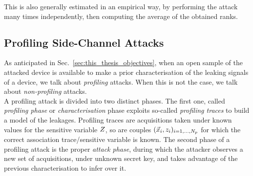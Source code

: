 This is also generally estimated in an empirical way, by performing the attack many times independently, then computing the average of the obtained ranks. 



\subsection{Profiling Side-Channel Attacks}\label{sec:profilingSCA}
As anticipated in Sec.~\ref{sec:this_thesis_objectives}, when an open sample of the attacked device is available to make a prior characterisation of the leaking signals of a device, we talk about \emph{profiling} attacks. When this is not the case, we talk about \emph{non-profiling} attacks. \\
A profiling attack is divided into two distinct phases. The first one, called \emph{profiling phase} or \emph{characterisation} phase exploits so-called \emph{profiling traces} to build a model of the leakages. Profiling traces are acquisitions taken under known values for the sensitive variable $Z$, so are couples $(\vec{x}_i, z_i)_{i=1, \dots , N_p}$ for which the correct association trace/sensitive variable is known. The second phase of a profiling attack is the proper \emph{attack phase}, during which the attacker observes a new set of acquisitions, under unknown secret key, and takes advantage of the previous characterisation to infer over it. \\

